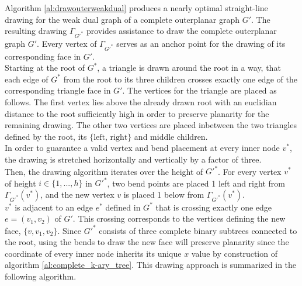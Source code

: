 Algorithm \ref{al:drawouterweakdual} produces a nearly optimal straight-line drawing for the weak dual graph of a complete outerplanar graph $G'$. The resulting drawing $\Gamma_{G'^*}$ provides assistance to draw the complete outerplanar graph $G'$. Every vertex of $\Gamma_{G'^*}$ serves as an anchor point for the drawing of its corresponding face in $G'$.\\
Starting at the root of $G^*$, a triangle is drawn around the root in a way, that each edge of $G^*$ from the root to its three children crosses exactly one edge of the corresponding triangle face in $G'$. The vertices for the triangle are placed as follows. The first vertex lies above the already drawn root with an euclidian distance to the root sufficiently high in order to preserve planarity for the remaining drawing. The other two vertices are placed inbetween the two triangles defined by the root, its $\{\text{left, right}\}$ and middle children.\\
In order to guarantee a valid vertex and bend placement at every inner node $v^*$, the drawing is stretched horizontally and vertically by a factor of three.\\
Then, the drawing algorithm iterates over the height of $G'^*$. For every vertex $v^*$ of height $i\in \{1,...,h\}$ in $G'^*$, two bend points are placed 1 \UL left and right from $\Gamma_{G'^*}(v^*)$, and the new vertex $v$ is placed 1 \UL below from $\Gamma_{G'^*}(v^*)$.\\
$v^*$ is adjacent to an edge $e^*$ defined in $G^*$ that is crossing exactly one edge $e = (v_1,v_2)$ of $G'$. This crossing corresponds to the vertices defining the new face, $\{v, v_1, v_2\}$. Since $G'^*$ consists of three complete binary subtrees connected to the root, using the bends to draw the new face will preserve planarity since the coordinate of every inner node inherits its unique $x$ value by construction of algorithm \ref{al:complete_k-ary_tree}.
This drawing approach is summarized in the following algorithm.\\
